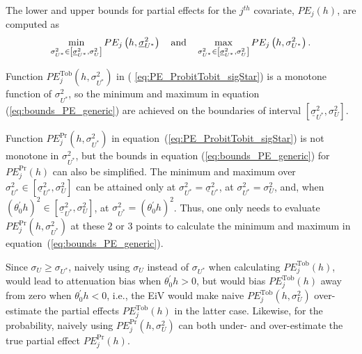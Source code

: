 \documentclass[11pt]{article}
\begin{document}
The lower and upper bounds for partial effects for the $j^{th}$ covariate, $%
PE_{j}\left( h\right) $, are computed as 
\begin{equation}
\min_{\sigma _{U^{\ast }}^{2}\in \left[ \underline{\sigma }_{U^{\ast
}}^{2},\sigma _{U}^{2}\right] }PE_{j}\left( h,\underline{\sigma }_{U^{\ast
}}^{2}\right) \text{\quad and\quad }\max_{\sigma _{U^{\ast }}^{2}\in \left[ 
\underline{\sigma }_{U^{\ast }}^{2},\sigma _{U}^{2}\right] }PE_{j}\left(
h,\sigma _{U^{\ast }}^{2}\right) .  \label{eq:bounds_PE_generic}
\end{equation}

Function $PE_{j}^{\text{Tob}}\left( h,\sigma _{U^{\ast }}^{2}\right) $ in (%
\ref{eq:PE_ProbitTobit_sigStar}) is a monotone function of $\sigma _{U^{\ast
}}^{2}$, so the minimum and maximum in equation (\ref{eq:bounds_PE_generic})
are achieved on the boundaries of interval $\left[ \underline{\sigma }%
_{U^{\ast }}^{2},\sigma _{U}^{2}\right] $.

Function $PE_{j}^{\Pr }\left( h,\sigma _{U^{\ast }}^{2}\right) $ in
equation~(\ref{eq:PE_ProbitTobit_sigStar}) is not monotone in $\sigma
_{U^{\ast }}^{2}$, but the bounds in equation (\ref{eq:bounds_PE_generic})
for $PE_{j}^{\Pr }\left( h\right) $ can also be simplified. The minimum and
maximum over $\sigma _{U^{\ast }}^{2}\in \left[ \underline{\sigma }_{U^{\ast
}}^{2},\sigma _{U}^{2}\right] $ can be attained only at $\sigma _{U^{\ast
}}^{2}=\underline{\sigma }_{U^{\ast }}^{2}$, at $\sigma _{U^{\ast
}}^{2}=\sigma _{U}^{2}$, and, when $\left( \theta _{0}^{\prime }h\right)
^{2}\in \left[ \underline{\sigma }_{U^{\ast }}^{2},\sigma _{U}^{2}\right] $,
at $\sigma _{U^{\ast }}^{2}=\left( \theta _{0}^{\prime }h\right) ^{2}$.
Thus, one only needs to evaluate $PE_{j}^{\Pr }\left( h,\sigma _{U^{\ast
}}^{2}\right) $ at these $2$ or $3$ points to calculate the minimum and
maximum in equation~(\ref{eq:bounds_PE_generic}).

Since $\sigma _{U}\geq \sigma _{U^{\ast }}$, naively using $\sigma _{U}$
instead of $\sigma _{U^{\ast }}$ when calculating $PE_{j}^{\text{Tob}}\left(
h\right) $, would lead to attenuation bias when $\theta _{0}^{\prime }h>0$,
but would bias $PE_{j}^{\text{Tob}}\left( h\right) $ away from zero when $%
\theta _{0}^{\prime }h<0$, i.e., the EiV would make naive $PE_{j}^{\text{Tob}%
}\left( h,\sigma _{U}^{2}\right) $ over-estimate the partial effects $%
PE_{j}^{\text{Tob}}\left( h\right) $ in the latter case. Likewise, for the
probability, naively using $PE_{j}^{\Pr }\left( h,\sigma _{U}^{2}\right) $
can both under- and over-estimate the true partial effect $PE_{j}^{\Pr
}\left( h\right) $.
\end{document}
